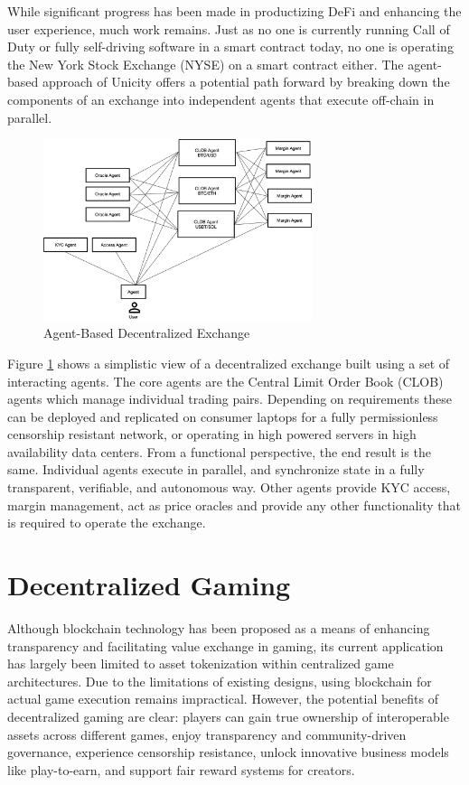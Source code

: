 \documentclass{article}
\begin{document}
\vspace{2mm}

While significant progress has been made in productizing DeFi and enhancing the user experience, much work remains. Just as no one is currently running Call of Duty or fully self-driving software in a smart contract today, no one is operating the New York Stock Exchange (NYSE) on a smart contract either. The agent-based approach of Unicity offers a potential path forward by breaking down the components of an exchange into independent agents that execute off-chain in parallel. 

\begin{figure}[H]
    \centering
    \includegraphics[width=0.7\textwidth]{ABEX.png}
    \caption{Agent-Based Decentralized Exchange}
    \label{fig:ABEX}
\end{figure}

 
Figure \ref{fig:ABEX} shows a simplistic view of a decentralized exchange built using a set of interacting agents. The core agents are the Central Limit Order Book (CLOB) agents which manage individual trading pairs. Depending on requirements these can be deployed and replicated on consumer laptops for a fully permissionless censorship resistant network, or operating in high powered servers in high availability data centers. From a functional perspective, the end result is the same. Individual agents execute in parallel, and synchronize state in a fully transparent, verifiable, and autonomous way. Other agents provide KYC access, margin management, act as price oracles and provide any other functionality that is required to operate the exchange. 


\section{Decentralized Gaming}

Although blockchain technology has been proposed as a means of enhancing transparency and facilitating value exchange in gaming, its current application has largely been limited to asset tokenization within centralized game architectures. Due to the limitations of existing designs, using blockchain for actual game execution remains impractical. However, the potential benefits of decentralized gaming are clear: players can gain true ownership of interoperable assets across different games, enjoy transparency and community-driven governance, experience censorship resistance, unlock innovative business models like play-to-earn, and support fair reward systems for creators.
\end{document}
